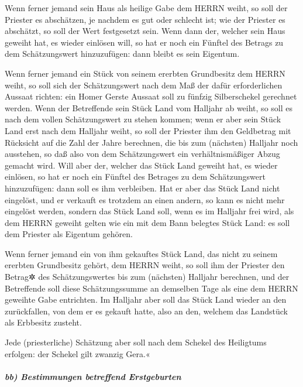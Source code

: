 Wenn ferner jemand sein Haus als heilige Gabe dem HERRN
weiht, so soll der Priester es abschätzen, je nachdem es gut oder
schlecht ist; wie der Priester es abschätzt, so soll der Wert
festgesetzt sein. Wenn dann der, welcher sein Haus
geweiht hat, es wieder einlösen will, so hat er noch ein Fünftel des
Betrags zu dem Schätzungswert hinzuzufügen: dann bleibt es sein
Eigentum.

Wenn ferner jemand ein Stück von seinem ererbten
Grundbesitz dem HERRN weiht, so soll sich der Schätzungswert nach dem
Maß der dafür erforderlichen Aussaat richten: ein Homer Gerste Aussaat
soll zu fünfzig Silberschekel gerechnet werden. Wenn der
Betreffende sein Stück Land vom Halljahr ab weiht, so soll es nach dem
vollen Schätzungswert zu stehen kommen; wenn er aber sein
Stück Land erst nach dem Halljahr weiht, so soll der Priester ihm den
Geldbetrag mit Rücksicht auf die Zahl der Jahre berechnen, die bis zum
(nächsten) Halljahr noch ausstehen, so daß also von dem Schätzungswert
ein verhältnismäßiger Abzug gemacht wird. Will aber der,
welcher das Stück Land geweiht hat, es wieder einlösen, so hat er noch
ein Fünftel des Betrages zu dem Schätzungswert hinzuzufügen: dann soll
es ihm verbleiben. Hat er aber das Stück Land nicht
eingelöst, und er verkauft es trotzdem an einen andern, so kann es nicht
mehr eingelöst werden, sondern das Stück Land soll, wenn
es im Halljahr frei wird, als dem HERRN geweiht gelten wie ein mit dem
Bann belegtes Stück Land: es soll dem Priester als Eigentum gehören.

Wenn ferner jemand ein von ihm gekauftes Stück Land, das
nicht zu seinem ererbten Grundbesitz gehört, dem HERRN weiht,
so soll ihm der Priester den Betrag✲ des Schätzungswertes
bis zum (nächsten) Halljahr berechnen, und der Betreffende soll diese
Schätzungssumme an demselben Tage als eine dem HERRN geweihte Gabe
entrichten. Im Halljahr aber soll das Stück Land wieder
an den zurückfallen, von dem er es gekauft hatte, also an den, welchem
das Landstück als Erbbesitz zusteht.

Jede (priesterliche) Schätzung aber soll nach dem Schekel
des Heiligtums erfolgen: der Schekel gilt zwanzig Gera.«

\hypertarget{bb-bestimmungen-betreffend-erstgeburten}{%
\subparagraph{bb) Bestimmungen betreffend
Erstgeburten}\label{bb-bestimmungen-betreffend-erstgeburten}}

